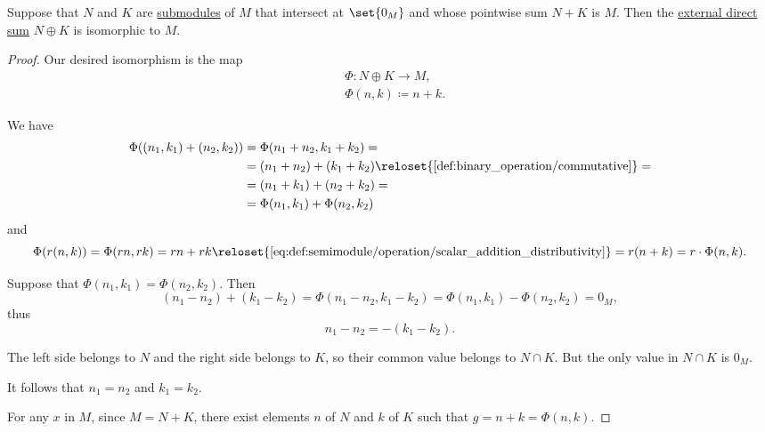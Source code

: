 \begin{proposition}\label{thm:internal_module_direct_sum_correctness}\mimprovised
  Suppose that \( N \) and \( K \) are \hyperref[def:module/subobject]{submodules} of \( M \) that intersect at \( \set{ 0_M } \) and whose pointwise sum \( N + K \) is \( M \). Then the \hyperref[def:external_semimodule_direct_sum]{external direct sum} \( N \oplus K \) is isomorphic to \( M \).
\end{proposition}
\begin{proof}
  Our desired isomorphism is the map
  \begin{equation*}
    \begin{aligned}
      &\Phi: N \oplus K \to M, \\
      &\Phi(n, k) \coloneqq n + k.
    \end{aligned}
  \end{equation*}

   We have
  \begin{align*}
    \Phi((n_1, k_1) + (n_2, k_2))
    &=
    \Phi(n_1 + n_2, k_1 + k_2)
    = \\ &=
    (n_1 + n_2) + (k_1 + k_2)
    \reloset {\eqref{def:binary_operation/commutative}} = \\ &=
    (n_1 + k_1) + (n_2 + k_2)
    = \\ &=
    \Phi(n_1, k_1) + \Phi(n_2, k_2)
  \end{align*}
  and
  \begin{equation*}
    \Phi(r(n, k))
    =
    \Phi(rn, rk)
    =
    rn + rk
    \reloset {\eqref{eq:def:semimodule/operation/scalar_addition_distributivity}} =
    r(n + k)
    =
    r \cdot \Phi(n, k).
  \end{equation*}

   Suppose that \( \Phi(n_1, k_1) = \Phi(n_2, k_2) \). Then
  \begin{equation*}
    (n_1 - n_2) + (k_1 - k_2)
    =
    \Phi(n_1 - n_2, k_1 - k_2)
    =
    \Phi(n_1, k_1) - \Phi(n_2, k_2)
    =
    0_M,
  \end{equation*}
  thus
  \begin{equation*}
    n_1 - n_2 = -(k_1 - k_2).
  \end{equation*}

  The left side belongs to \( N \) and the right side belongs to \( K \), so their common value belongs to \( N \cap K \). But the only value in \( N \cap K \) is \( 0_M \).

  It follows that \( n_1 = n_2 \) and \( k_1 = k_2 \).

   For any \( x \) in \( M \), since \( M = N + K \), there exist elements \( n \) of \( N \) and \( k \) of \( K \) such that \( g = n + k = \Phi(n, k) \).
\end{proof}

